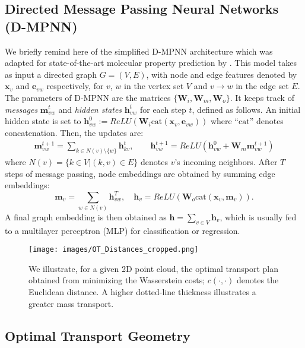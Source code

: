 \documentclass[letterpaper]{article} \usepackage{aaai22}  \usepackage{times}  \usepackage{helvet}  \usepackage{courier}  \usepackage[hyphens]{url}  \usepackage{graphicx} \urlstyle{rm} \def\UrlFont{\rm}  \usepackage{natbib}  \usepackage{caption} \DeclareCaptionStyle{ruled}{labelfont=normalfont,labelsep=colon,strut=off} \frenchspacing  \setlength{\pdfpagewidth}{8.5in}  \setlength{\pdfpageheight}{11in}  \usepackage{algorithm}
\newcommand{\x}{{\mathbf x}}
\newcommand{\h}{{\mathbf h}}
\newcommand{\m}{{\mathbf m}}
\newcommand{\e}{{\mathbf e}}
\newcommand{\W}{{\mathbf W}}
\begin{document}
\subsection{Directed Message Passing Neural Networks (D-MPNN)} \label{sec:dmpnn}
We briefly remind here of the simplified D-MPNN \citep{dai2016discriminative} architecture which was  adapted for state-of-the-art molecular property prediction by \cite{yang2019analyzing}. This model takes as input a directed graph $G=(V,E)$, with node and edge features denoted by $\x_v$ and $\e_{vw}$ respectively, for $v$, $w$ in the vertex set $V$ and  $v\to w$ in the edge set $E$. The parameters of D-MPNN are the matrices $\{\W_i, \W_m, \W_o\}$. It keeps track of \textit{messages} $\m_{vw}^t$ and \textit{hidden states} $\h_{vw}^t$ for each step $t$, defined as follows. An initial hidden state is set to $\h_{vw}^0:= ReLU(\W_i\mathrm{cat}(\x_v,\e_{vw}))$ where ``$\mathrm{cat}$'' denotes concatenation. Then, the updates are:\begin{equation}
\begin{split}
\m_{vw}^{t+1}=\sum_{k\in N(v)\setminus\{w\}} \h_{kv}^t, \quad\quad \h_{vw}^{t+1}=ReLU(\h_{vw}^0+\W_m \m_{vw}^{t+1})
\end{split}
\end{equation}
where $N(v)=\{k\in V|(k,v)\in E\}$ denotes $v$'s incoming neighbors. After $T$ steps of message passing, node embeddings are obtained by summing edge embeddings:
\begin{equation}
\m_v = \sum_{w\in N(v)} \h^T_{vw}, \quad \h_v = ReLU(\W_o\mathrm{cat}(\x_v,\m_v)).
\end{equation}
A final graph embedding is then obtained as $\h=\sum_{v\in V}\h_v$, which is usually fed to a multilayer perceptron (MLP) for classification or regression. 
 

\begin{figure}[h]
    \centering
    \texttt{[image: images/OT\_Distances\_cropped.png]}
    \caption{We illustrate, for a given 2D point cloud, the optimal transport plan obtained from minimizing the Wasserstein costs;  $c(\cdot,\cdot)$ denotes the Euclidean distance.
  A higher dotted-line thickness illustrates a greater mass transport.}
    \label{fig:ot_dist}
\end{figure}


\subsection{Optimal Transport Geometry} 
\end{document}
